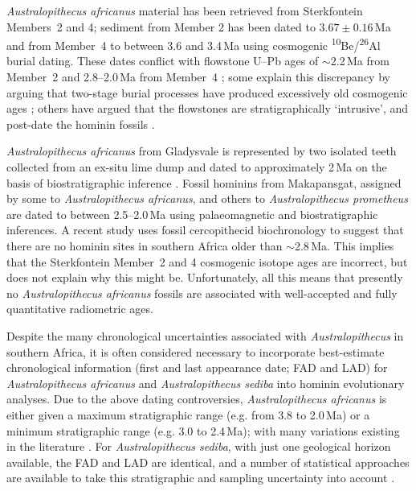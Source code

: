 \documentclass[11pt]{article}
\begin{document}
\emph{Australopithecus africanus} material has been retrieved from
Sterkfontein Members~2 and 4; sediment from Member 2 has been dated to
$3.67 \pm 0.16$\,Ma \citep{granger2015} and from Member~4 to between
3.6 and 3.4\,Ma \citep{granger2022} using cosmogenic
\textsuperscript{10}Be/\textsuperscript{26}Al burial dating. These
dates conflict with flowstone U--Pb ages of $\sim$2.2\,Ma from
Member~2 \citep{walker2006,pickering2019} and 2.8--2.0\,Ma from
Member~4 \citep{pickering2010,pickering2019}; some explain this
discrepancy by arguing that two-stage burial processes have produced
excessively old cosmogenic ages \citep{kramers2017}; others have
argued that the flowstones are stratigraphically `intrusive', and
post-date the hominin fossils \citep{bruxelles2019}.

\emph{Australopithecus africanus} from Gladysvale \citep{berger1993a}
is represented by two isolated teeth collected from an ex-situ lime
dump and dated to approximately 2\,Ma on the basis of biostratigraphic
inference \citep{berger1993b}. Fossil hominins from Makapansgat,
assigned by some to \emph{Australopithecus africanus},
\citep{berger2019c} and others to \emph{Australopithecus prometheus}
\citep{clarke2019} are dated to between 2.5--2.0\,Ma using
palaeomagnetic and biostratigraphic inferences. A recent study uses
fossil cercopithecid biochronology \citep{frost2022} to suggest that
there are no hominin sites in southern Africa older than
$\sim$2.8\,Ma. This implies that the Sterkfontein Member~2 and 4
cosmogenic isotope ages are incorrect, but does not explain why this
might be. Unfortunately, all this means that presently no
\emph{Australopithecus africanus} fossils are associated with
well-accepted and fully quantitative radiometric ages.

Despite the many chronological uncertainties associated with
\emph{Australopithecus} in southern Africa, it is often considered
necessary to incorporate best-estimate chronological information
(first and last appearance date; FAD and LAD) for
\emph{Australopithecus africanus} and \emph{Australopithecus sediba}
into hominin evolutionary analyses.  Due to the above dating
controversies, \emph{Australopithecus africanus} is either given a
maximum stratigraphic range (e.g. from 3.8 to 2.0\,Ma) or a minimum
stratigraphic range (e.g. 3.0 to 2.4\,Ma); with many variations
existing in the literature
\citep[e.g.][]{wood2016,vanholstein2022,vanholstein2024,puschel2021,mongle2022}. For
\emph{Australopithecus sediba}, with just one geological horizon
available, the FAD and LAD are identical, and a number of statistical
approaches are available to take this stratigraphic and sampling
uncertainty into account \citep[e.g.][]{hopley2022b,vanholstein2024}.
\end{document}
